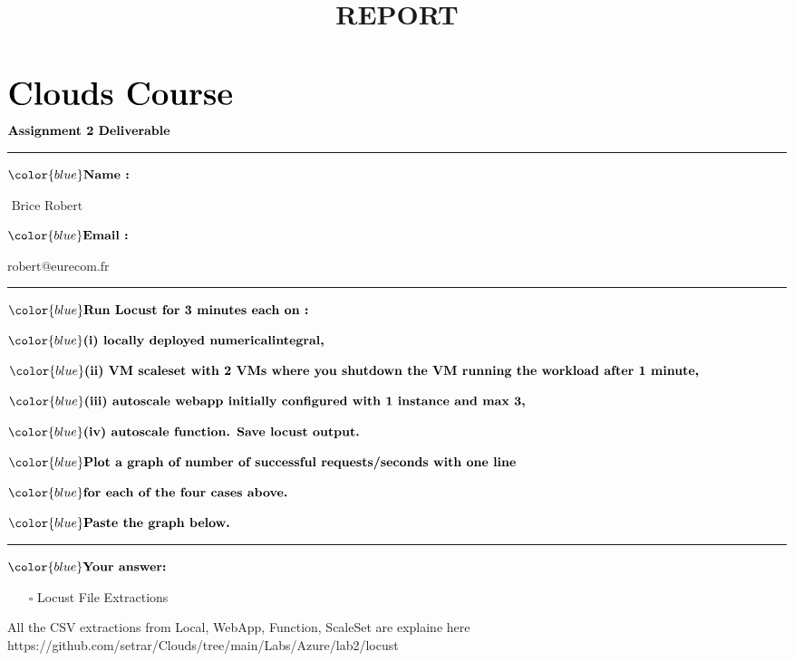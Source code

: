 \documentclass[11pt]{article}
\title{REPORT}
\providecommand{\tightlist}{%
      \setlength{\itemsep}{0pt}\setlength{\parskip}{0pt}}
\begin{document}
    
    \maketitle
    
    

    
    \(\Huge{\textbf{Clouds Course}}\)

\(\normalsize{\textbf{Assignment 2 Deliverable}}\)

    \begin{center}\rule{0.5\linewidth}{0.5pt}\end{center}

\(\color{blue}\textbf{Name :}\)

\(\boxed{\text{        Brice Robert          }}\)

\(\color{blue}\textbf{Email :}\)

\(\boxed{\text{robert@eurecom.fr}}\)

\begin{center}\rule{0.5\linewidth}{0.5pt}\end{center}

    \(\color{blue}\textbf{Run Locust for 3 minutes each on :}\)

\(\color{blue}\textbf{(i) locally deployed numericalintegral, }\)

\(\color{blue}\textbf{(ii) VM scaleset with 2 VMs where you shutdown the VM running the workload after 1 minute, }\)

\(\color{blue}\textbf{(iii) autoscale webapp initially configured with 1 instance and max 3, }\)

\(\color{blue}\textbf{(iv) autoscale function. Save locust output. }\)

\(\color{blue}\textbf{Plot a graph of number of successful requests/seconds with one line }\)

\(\color{blue}\textbf{for each of the four cases above.}\)

\(\color{blue}\textbf{Paste the graph below.}\)

\begin{center}\rule{0.5\linewidth}{0.5pt}\end{center}

\(\color{blue} \textbf{Your answer:}\)

    \begin{itemize}
\tightlist
\item[$\square$]
  Locust File Extractions
\end{itemize}

All the CSV extractions from Local, WebApp, Function, ScaleSet are
explaine here
https://github.com/setrar/Clouds/tree/main/Labs/Azure/lab2/locust
\end{document}
